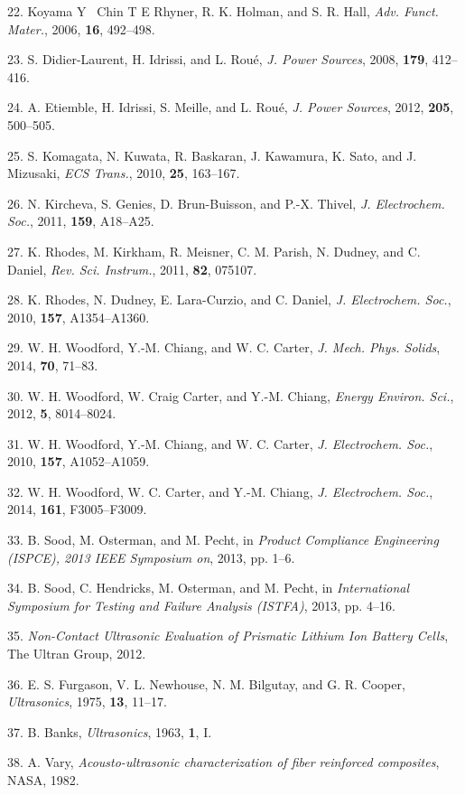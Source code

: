 \documentclass[]{article}
\begin{document}
22.{ }Koyama Y~ Chin T E Rhyner, R. K. Holman, and S. R. Hall,
\emph{Adv. Funct. Mater.}, 2006, \textbf{16}, 492--498.

23.{ }S. Didier-Laurent, H. Idrissi, and L. Roué, \emph{J. Power
Sources}, 2008, \textbf{179}, 412--416.

24.{ }A. Etiemble, H. Idrissi, S. Meille, and L. Roué, \emph{J. Power
Sources}, 2012, \textbf{205}, 500--505.

25.{ }S. Komagata, N. Kuwata, R. Baskaran, J. Kawamura, K. Sato, and J.
Mizusaki, \emph{ECS Trans.}, 2010, \textbf{25}, 163--167.

26.{ }N. Kircheva, S. Genies, D. Brun-Buisson, and P.-X. Thivel,
\emph{J. Electrochem. Soc.}, 2011, \textbf{159}, A18--A25.

27.{ }K. Rhodes, M. Kirkham, R. Meisner, C. M. Parish, N. Dudney, and C.
Daniel, \emph{Rev. Sci. Instrum.}, 2011, \textbf{82}, 075107.

28.{ }K. Rhodes, N. Dudney, E. Lara-Curzio, and C. Daniel, \emph{J.
Electrochem. Soc.}, 2010, \textbf{157}, A1354--A1360.

29.{ }W. H. Woodford, Y.-M. Chiang, and W. C. Carter, \emph{J. Mech.
Phys. Solids}, 2014, \textbf{70}, 71--83.

30.{ }W. H. Woodford, W. Craig Carter, and Y.-M. Chiang, \emph{Energy
Environ. Sci.}, 2012, \textbf{5}, 8014--8024.

31.{ }W. H. Woodford, Y.-M. Chiang, and W. C. Carter, \emph{J.
Electrochem. Soc.}, 2010, \textbf{157}, A1052--A1059.

32.{ }W. H. Woodford, W. C. Carter, and Y.-M. Chiang, \emph{J.
Electrochem. Soc.}, 2014, \textbf{161}, F3005--F3009.

33.{ }B. Sood, M. Osterman, and M. Pecht, in \emph{Product Compliance
Engineering (ISPCE), 2013 IEEE Symposium on}, 2013, pp. 1--6.

34.{ }B. Sood, C. Hendricks, M. Osterman, and M. Pecht, in
\emph{International Symposium for Testing and Failure Analysis (ISTFA)},
2013, pp. 4--16.

35.{ }\emph{Non-Contact Ultrasonic Evaluation of Prismatic Lithium Ion
Battery Cells}, The Ultran Group, 2012.

36.{ }E. S. Furgason, V. L. Newhouse, N. M. Bilgutay, and G. R. Cooper,
\emph{Ultrasonics}, 1975, \textbf{13}, 11--17.

37.{ }B. Banks, \emph{Ultrasonics}, 1963, \textbf{1}, I.

38.{ }A. Vary, \emph{Acousto-ultrasonic characterization of fiber
reinforced composites}, NASA, 1982.
\end{document}
